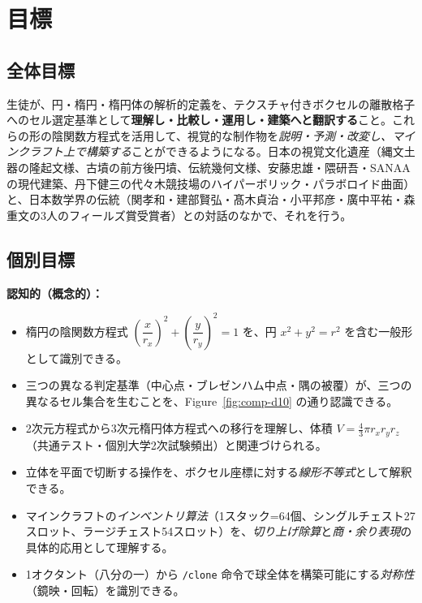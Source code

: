 \documentclass[12pt,a4paper]{scrartcl}
\newcommand{\acc}[1]{\textcolor{accent}{\textbf{#1}}}
\newcommand{\cmd}[1]{\textcolor{earth}{\texttt{\small #1}}}
\begin{document}
\section{目標}\label{sec:objetivos}

\subsection{全体目標}

生徒が、円・楕円・楕円体の解析的定義を、テクスチャ付きボクセルの離散格子へのセル選定基準として\acc{理解し・比較し・運用し・建築へと翻訳する}こと。これらの形の陰関数方程式を活用して、視覚的な制作物を\emph{説明・予測・改変し、マインクラフト上で構築する}ことができるようになる。日本の視覚文化遺産（縄文土器の隆起文様、古墳の前方後円墳、伝統幾何文様、安藤忠雄・隈研吾・SANAA の現代建築、丹下健三の代々木競技場のハイパーボリック・パラボロイド曲面）と、日本数学界の伝統（関孝和・建部賢弘・髙木貞治・小平邦彦・廣中平祐・森重文の3人のフィールズ賞受賞者）との対話のなかで、それを行う。

\subsection{個別目標}

\textbf{認知的（概念的）：}
\begin{itemize}[leftmargin=1.3em,itemsep=0.2em,topsep=0.3em]
  \item 楕円の陰関数方程式 $\left(\dfrac{x}{r_x}\right)^{\!2} + \left(\dfrac{y}{r_y}\right)^{\!2} = 1$ を、円 $x^2 + y^2 = r^2$ を含む一般形として識別できる。
  \item 三つの異なる判定基準（中心点・ブレゼンハム中点・隅の被覆）が、三つの異なるセル集合を生むことを、Figure~\ref{fig:comp-d10} の通り認識できる。
  \item 2次元方程式から3次元楕円体方程式への移行を理解し、体積 $V = \tfrac{4}{3}\pi r_x r_y r_z$（共通テスト・個別大学2次試験頻出）と関連づけられる。
  \item 立体を平面で切断する操作を、ボクセル座標に対する\emph{線形不等式}として解釈できる。
  \item マインクラフトの\emph{インベントリ算法}（1スタック=64個、シングルチェスト27スロット、ラージチェスト54スロット）を、\emph{切り上げ除算}と\emph{商・余り表現}の具体的応用として理解する。
  \item 1オクタント（八分の一）から \cmd{/clone} 命令で球全体を構築可能にする\emph{対称性}（鏡映・回転）を識別できる。
\end{itemize}
\end{document}
